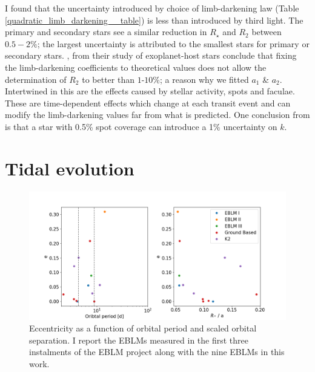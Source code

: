 I found that the uncertainty introduced by choice of limb-darkening law (Table \ref{quadratic_limb_darkening__table}) is less than introduced by third light. The primary and secondary stars see a similar reduction in $R_{\star}$ and $R_2$ between $0.5-2\%$; the largest uncertainty is attributed to the smallest stars for primary or secondary stars. \citet{2013A&A...549A...9C}, from their study of  exoplanet-host stars conclude that fixing the limb-darkening coefficients to theoretical values does not allow the determination of $R_2$ to better than $1$-$10 \%$; a reason why we fitted $a_1$ \& $a_2$. Intertwined in this are the effects caused by stellar activity, spots and faculae. These are time-dependent effects which change at each transit event and can modify the limb-darkening values far from what is predicted. One conclusion from \citet{2013A&A...549A...9C} is that a star with 0.5\% spot coverage can introduce a 1\% uncertainty on $k$.




\section{Tidal evolution}\label{discuss:tidal}


\begin{figure}
    \centering
    \includegraphics[width=\textwidth]{9-Discussion/images/tidal_trends_1.png}
    \caption{Eccentricity as a function of orbital period and scaled orbital separation. I report the EBLMs measured in the first three instalments of the EBLM project along with the nine EBLMs in this work.}
    \label{discussion:fig:tidal1}
\end{figure}

